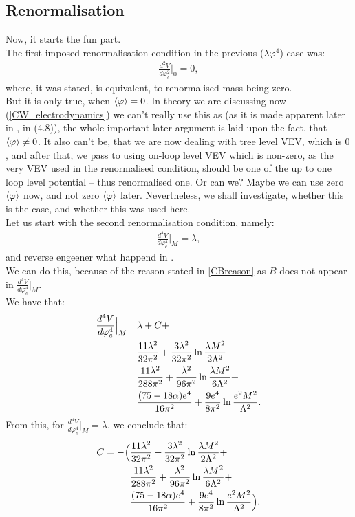 \subsection{Renormalisation}\label{CW_renormalisation_scalar_el}
Now, it starts the fun part. \\
The first imposed renormalisation condition in the previous ($\lambda\varphi^4$) case was:
\begin{align}
\frac{d^2V}{d\varphi_c^2}\Big|_0=0,
\end{align}
where, it was stated, is equivalent, to renormalised mass being zero. \\
But it is only true, when $\langle\varphi\rangle = 0$. In theory we are discussing now (\ref{CW_electrodynamics}) 
we can't really use this as (as it is made apparent later in \cite{Coleman1973}, in (4.8)), the 
whole important later argument is laid upon the fact, that $\langle\varphi\rangle \neq 0$. It also can't be, that 
we are now dealing with tree level VEV, which is $0$, and after that, we pass to using on-loop 
level VEV which is non-zero, as the very VEV used in the renormalised condition, should be one 
of the up to one loop level potential -- thus renormalised one. Or can we? Maybe we can use 
zero $\langle\varphi\rangle$ now, and not zero $\langle\varphi\rangle$ later. Nevertheless, we shall investigate, whether this is 
the case, and whether this was used here. \\
Let us start with the second renormalisation condition, namely:
\begin{align}
\frac{d^4V}{d\varphi_c^4}\Big|_M=\lambda,
\end{align}
and reverse engeener what happend in \cite{Coleman1973}. \\
We can do this, because of the reason stated in \ref{CBreason} as $B$ does not appear in 
$\frac{d^4V}{d\varphi_c^4}\Big|_M$. \\
We have that:
\begin{align}
\frac{d^4V}{d\varphi_c^4}\Big|_M = &\lambda + C + \notag \\
&\frac{11\lambda^2}{32\pi^2}+\frac{3\lambda^2}{32\pi^2}\ln\frac{\lambda M^2}{2\Lambda^2}+\notag \\
&\frac{11\lambda^2}{288\pi^2}+\frac{\lambda^2}{96\pi^2}\ln\frac{\lambda M^2}{6\Lambda^2}+\notag \\
&\frac{(75-18\alpha)e^4}{16\pi^2}+\frac{9e^4}{8\pi^2}\ln\frac{e^2M^2}{\Lambda^2}. 
\end{align}
From this, for $\frac{d^4V}{d\varphi_c^4}\Big|_M=\lambda$, we conclude that:
\begin{align}
C = -\Big(
&\frac{11\lambda^2}{32\pi^2}+\frac{3\lambda^2}{32\pi^2}\ln\frac{\lambda M^2}{2\Lambda^2}+\notag \\
&\frac{11\lambda^2}{288\pi^2}+\frac{\lambda^2}{96\pi^2}\ln\frac{\lambda M^2}{6\Lambda^2}+\notag \\
&\frac{(75-18\alpha)e^4}{16\pi^2}+\frac{9e^4}{8\pi^2}\ln\frac{e^2M^2}{\Lambda^2}
\Big).
\end{align}
